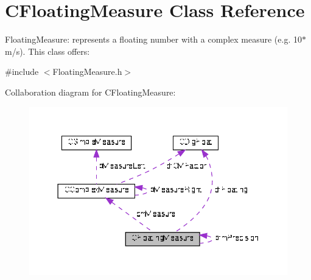 \hypertarget{classCFloatingMeasure}{}\section{C\+Floating\+Measure Class Reference}
\label{classCFloatingMeasure}


Floating\+Measure\+: represents a floating number with a complex measure (e.\+g. 10$\ast$m/s). This class offers\+:  




{\ttfamily \#include $<$Floating\+Measure.\+h$>$}



Collaboration diagram for C\+Floating\+Measure\+:
\nopagebreak
\begin{figure}[H]
\begin{center}
\leavevmode
\includegraphics[width=350pt]{d5/d9a/classCFloatingMeasure__coll__graph}
\end{center}
\end{figure}
